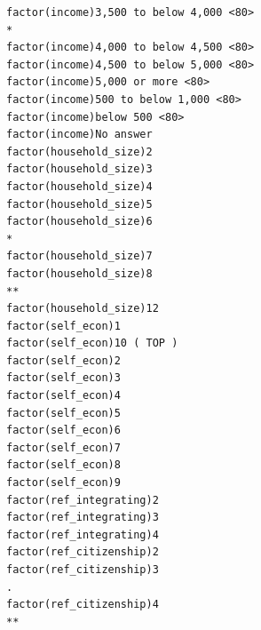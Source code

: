 \documentclass[
]{article}
\begin{document}
\begin{table}
\begin{minipage}[t]{\linewidth}
{\begin{verbatim}
factor(income)3,500 to below 4,000 <80>                                           *  
factor(income)4,000 to below 4,500 <80>                                              
factor(income)4,500 to below 5,000 <80>                                              
factor(income)5,000 or more <80>                                                     
factor(income)500 to below 1,000 <80>                                                
factor(income)below 500 <80>                                                         
factor(income)No answer                                                              
factor(household_size)2                                                              
factor(household_size)3                                                              
factor(household_size)4                                                              
factor(household_size)5                                                              
factor(household_size)6                                                           *  
factor(household_size)7                                                              
factor(household_size)8                                                           ** 
factor(household_size)12                                                             
factor(self_econ)1                                                                   
factor(self_econ)10 ( TOP )                                                          
factor(self_econ)2                                                                   
factor(self_econ)3                                                                   
factor(self_econ)4                                                                   
factor(self_econ)5                                                                   
factor(self_econ)6                                                                   
factor(self_econ)7                                                                   
factor(self_econ)8                                                                   
factor(self_econ)9                                                                   
factor(ref_integrating)2                                                             
factor(ref_integrating)3                                                             
factor(ref_integrating)4                                                             
factor(ref_citizenship)2                                                             
factor(ref_citizenship)3                                                          .  
factor(ref_citizenship)4                                                          ** 

\end{verbatim}}
\end{minipage}
\end{table}
\end{document}
